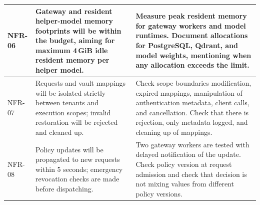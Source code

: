 \documentclass{FastFyp}
\begin{document}
\begin{longtable}{|P{1.5cm}|P{5.2cm}|P{7.6cm}|}
NFR-06 & Gateway and resident helper-model memory footprints will be within the budget, aiming for maximum 4\,GiB idle resident memory per helper model. & Measure peak resident memory for gateway workers and model runtimes. Document allocations for PostgreSQL, Qdrant, and model weights, mentioning when any allocation exceeds the limit.\\\hline
NFR-07 & Requests and vault mappings will be isolated strictly between tenants and execution scopes; invalid restoration will be rejected and cleaned up. & Check scope boundaries modification, expired mappings, manipulation of authentication metadata, client calls, and cancellation. Check that there is rejection, only metadata logged, and cleaning up of mappings.\\\hline
NFR-08 & Policy updates will be propagated to new requests within 5 seconds; emergency revocation checks are made before dispatching. & Two gateway workers are tested with delayed notification of the update. Check policy version at request admission and check that decision is not mixing values from different policy versions.\\\hline
\end{longtable}\endgroup
\end{document}
